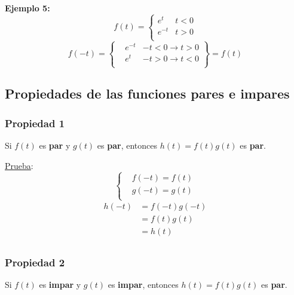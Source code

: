 \textbf{Ejemplo 5:}
\begin{equation*}
    f(t)=\begin{cases}
        e^t &t<0\\
        e^{-t} &t>0\\
    \end{cases}
\end{equation*}
\begin{equation*}
    f(-t)=\left\{\!\begin{aligned}
    &e^{-t} &-t<0 \rightarrow t>0\\
    &e^{t}  &-t>0 \rightarrow t<0\\
    \end{aligned}\right\}
    =f(t)
\end{equation*}
\begin{figure}[H]
    \centering
    
\end{figure}

\subsection{Propiedades de las funciones pares e impares}
\subsubsection*{Propiedad 1}
Si $f(t)$ es \textbf{par} y $g(t)$ es \textbf{par}, entonces $h(t)=f(t)g(t)$ es
\textbf{par}.

\underline{Prueba}:
\begin{equation*}
\begin{cases}
    &f(-t)=f(t)\\
    &g(-t)=g(t)\\
\end{cases}
\end{equation*}
\begin{equation*}
\begin{split}
    h(-t)
        &=f(-t)g(-t)\\
        &=f(t)g(t)\\
        &=h(t)\\
\end{split}
\end{equation*}

\subsubsection*{Propiedad 2}
Si $f(t)$ es \textbf{impar} y $g(t)$ es \textbf{impar}, entonces $h(t)=f(t)g(t)$
es \textbf{par}.

